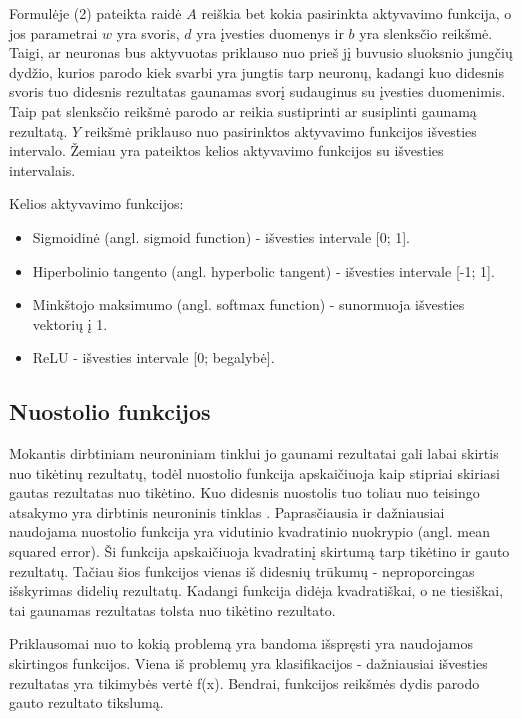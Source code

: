 \documentclass{VUMIFPSbakalaurinis}
\begin{document}
Formulėje (2) pateikta raidė \(A\) reiškia bet kokia pasirinkta aktyvavimo funkcija, o jos parametrai \(w\) yra svoris, \(d\) yra įvesties duomenys ir \(b\) yra slenksčio reikšmė. Taigi, ar neuronas bus aktyvuotas priklauso nuo prieš jį 
buvusio sluoksnio jungčių dydžio, kurios parodo kiek svarbi yra jungtis tarp neuronų, kadangi kuo didesnis svoris tuo didesnis rezultatas gaunamas svorį sudauginus su įvesties duomenimis. Taip pat slenksčio reikšmė parodo ar reikia 
sustiprinti ar susiplinti gaunamą rezultatą. \(Y\) reikšmė priklauso nuo pasirinktos aktyvavimo funkcijos išvesties intervalo. Žemiau yra pateiktos kelios aktyvavimo funkcijos su išvesties intervalais.  

Kelios aktyvavimo funkcijos:
\begin{itemize}
\item Sigmoidinė (angl. sigmoid function) - išvesties intervale [0; 1].
\item Hiperbolinio tangento (angl. hyperbolic tangent) - išvesties intervale [-1; 1].
\item Minkštojo maksimumo (angl. softmax function) - sunormuoja išvesties vektorių į 1.
\item ReLU - išvesties intervale [0; begalybė].
\end{itemize}

\subsection{Nuostolio funkcijos}
Mokantis dirbtiniam neuroniniam tinklui jo gaunami rezultatai gali labai skirtis nuo tikėtinų rezultatų, todėl nuostolio funkcija apskaičiuoja kaip stipriai
skiriasi gautas rezultatas nuo tikėtino. Kuo didesnis nuostolis tuo toliau nuo teisingo atsakymo yra dirbtinis neuroninis tinklas \cite{Cameron-loss-fun}.
Paprasčiausia ir dažniausiai naudojama nuostolio funkcija yra vidutinio kvadratinio nuokrypio (angl. mean squared error). Ši funkcija apskaičiuoja kvadratinį skirtumą tarp tikėtino 
ir gauto rezultatų. Tačiau šios funkcijos vienas iš didesnių trūkumų - neproporcingas išskyrimas didelių rezultatų. Kadangi funkcija didėja kvadratiškai,
o ne tiesiškai, tai gaunamas rezultatas tolsta nuo tikėtino rezultato.

Priklausomai nuo to kokią problemą yra bandoma išspręsti yra naudojamos skirtingos funkcijos. Viena iš problemų yra klasifikacijos - dažniausiai išvesties
rezultatas yra tikimybės vertė f(x). Bendrai, funkcijos reikšmės dydis parodo gauto rezultato tikslumą.
\end{document}
